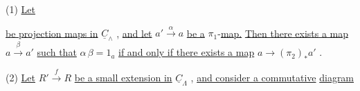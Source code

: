 (1) \underline{Let}    \underline{be projection maps in}  $\underline{C}_{\wedge}$ , \underline{and let}  $a' \xrightarrow{\ \alpha\ } a$
\underline{be a}  $\pi_1$-\underline{map.} \underline{Then there exists a map}  $a \xrightarrow{\ \beta\ } a'$  \underline{such that}  $\alpha\,\beta = 1_a$ \underline{if and only if there exists a map}  $a \longrightarrow (\pi_2)_* a'$  .

(2)  \underline{Let}  $R' \xrightarrow{\ f\ } R$  \underline{be a small extension in}  $\underline{C}_{\Lambda}$  , \underline{and consider a commutative} \underline{diagram}

